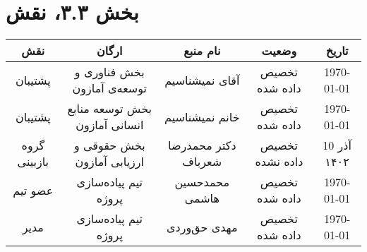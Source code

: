 \chapter{بخش ۳.۳، نقش\\}

\begin{table}[H]
\begin{adjustbox}{width=\textwidth}
\begin{tabular}{|c|c|c|c|c|}
\hline
نقش &
ارگان &
نام منبع &
وضعیت &
تاریخ \\
\hline
\hline
پشتیبان&
بخش فناوری و توسعه‌ی آمازون &
آقای نمیشناسیم &
تخصیص داده شده &
\today\\
\hline
پشتیبان&
بخش توسعه منابع انسانی آمازون &
خانم نمیشناسیم &
تخصیص داده شده &
\today\\
\hline
گروه بازبینی &
بخش حقوقی و ارزیابی آمازون &
دکتر محمدرضا شعرباف &
تخصیص داده نشده &
10 آذر ۱۴۰۲\\
\hline
عضو تیم &
تیم پیاده‌سازی پروژه &
محمدحسین هاشمی&
تخصیص داده شده&
\today\\
\hline
مدیر &
تیم پیاده‌سازی پروژه &
مهدی حق‌وردی&
تخصیص داده شده&
\today\\
\hline
\end{tabular}
\end{adjustbox}
\end{table}